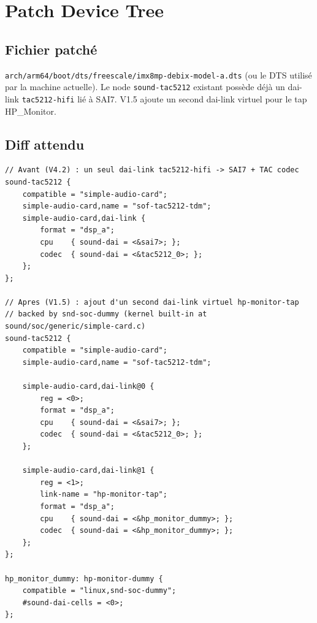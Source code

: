 \documentclass[11pt,a4paper]{article}
\begin{document}
\begin{center}
\end{center}

\section{Patch Device Tree}

\subsection{Fichier patché}

\texttt{arch/arm64/boot/dts/freescale/imx8mp-debix-model-a.dts} (ou le DTS utilisé par la machine actuelle). Le node \texttt{sound-tac5212} existant possède déjà un dai-link \texttt{tac5212-hifi} lié à SAI7. V1.5 ajoute un second dai-link virtuel pour le tap HP\_Monitor.

\subsection{Diff attendu}

\begin{lstlisting}[language={}, basicstyle=\ttfamily\scriptsize]
// Avant (V4.2) : un seul dai-link tac5212-hifi -> SAI7 + TAC codec
sound-tac5212 {
    compatible = "simple-audio-card";
    simple-audio-card,name = "sof-tac5212-tdm";
    simple-audio-card,dai-link {
        format = "dsp_a";
        cpu    { sound-dai = <&sai7>; };
        codec  { sound-dai = <&tac5212_0>; };
    };
};

// Apres (V1.5) : ajout d'un second dai-link virtuel hp-monitor-tap
// backed by snd-soc-dummy (kernel built-in at sound/soc/generic/simple-card.c)
sound-tac5212 {
    compatible = "simple-audio-card";
    simple-audio-card,name = "sof-tac5212-tdm";

    simple-audio-card,dai-link@0 {
        reg = <0>;
        format = "dsp_a";
        cpu    { sound-dai = <&sai7>; };
        codec  { sound-dai = <&tac5212_0>; };
    };

    simple-audio-card,dai-link@1 {
        reg = <1>;
        link-name = "hp-monitor-tap";
        format = "dsp_a";
        cpu    { sound-dai = <&hp_monitor_dummy>; };
        codec  { sound-dai = <&hp_monitor_dummy>; };
    };
};

hp_monitor_dummy: hp-monitor-dummy {
    compatible = "linux,snd-soc-dummy";
    #sound-dai-cells = <0>;
};
\end{lstlisting}
\end{document}
